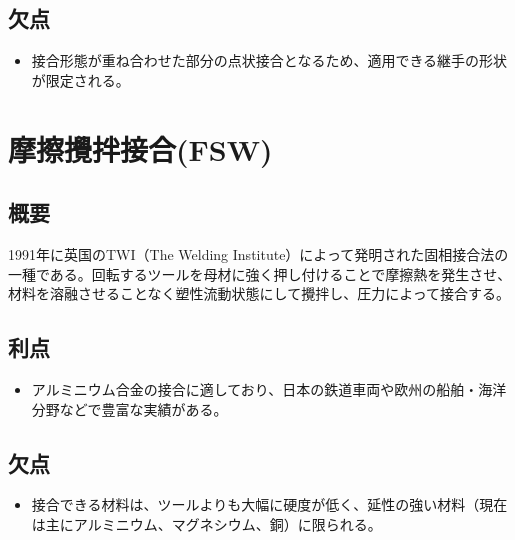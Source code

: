 \documentclass[a4j]{jsarticle}
\begin{document}
\subsection*{欠点}
\begin{itemize}
    \item 接合形態が重ね合わせた部分の点状接合となるため、適用できる継手の形状が限定される。
\end{itemize}

\section*{摩擦攪拌接合(FSW)}

\subsection*{概要}
1991年に英国のTWI（The Welding Institute）によって発明された固相接合法の一種である。回転するツールを母材に強く押し付けることで摩擦熱を発生させ、材料を溶融させることなく塑性流動状態にして攪拌し、圧力によって接合する。

\subsection*{利点}
\begin{itemize}
    \item アルミニウム合金の接合に適しており、日本の鉄道車両や欧州の船舶・海洋分野などで豊富な実績がある。
\end{itemize}

\subsection*{欠点}
\begin{itemize}
    \item 接合できる材料は、ツールよりも大幅に硬度が低く、延性の強い材料（現在は主にアルミニウム、マグネシウム、銅）に限られる。
\end{itemize}
\end{document}
